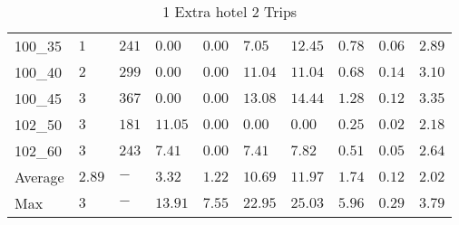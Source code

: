 \begin{center}
\begin{table}[]
\begin{tabular}{|lll|l|l|ll|lll|}
100\_35  & $1$    & $241$  & $\bm{0.00}$   & $\bm{0.00}$     & $7.05 $      & $12.45$     & $0.78$   & $0.06$     & $2.89$      \\
100\_40  & $2$    & $299$  & $\bm{0.00}$   & $\bm{0.00}$     & $11.04$      & $11.04$     & $0.68$   & $0.14$     & $3.10$      \\
100\_45  & $3$    & $367$  & $\bm{0.00}$   & $\bm{0.00}$     & $13.08$      & $14.44$     & $1.28$   & $0.12$     & $3.35$      \\
\hline
102\_50  & $3$    & $181$  & $11.05$  & $\bm{0.00}$     & $\bm{0.00}$       & $\bm{0.00}$      & $0.25$   & $0.02$     & $2.18$      \\
102\_60  & $3$    & $243$  & $7.41 $  & $\bm{0.00}$     & $7.41$       & $7.82$      & $0.51$   & $0.05$     & $2.64$      \\
\hline
Average & $2.89$  & $-$    & $3.32 $  & $1.22$     & $10.69$      & $11.97$     & $1.74$   & $0.12$     & $2.02$      \\
Max     & $3   $  & $-$    & $13.91$  & $7.55$     & $22.95$      & $25.03$     & $5.96$   & $0.29$     & $3.79$      \\
\hline
    \end{tabular}
    \caption{1 Extra hotel 2 Trips}
    \label{1-2}
    \end{table}
\end{center}
